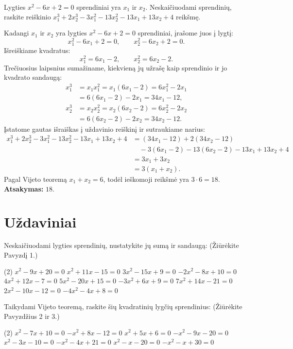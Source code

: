 \documentclass[11pt,a4paper]{scrartcl}
\begin{document}
\begin{example}
Lygties $x^2-6x+2=0$ sprendiniai yra $x_1$ ir $x_2$. Neskaičiuodami sprendinių, raskite reiškinio $x_1^3+2x_2^3-3x_1^2-13x_2^2-13x_1+13x_2+4$ reikšmę.
\end{example}
\begin{solution}
Kadangi $x_1$ ir $x_2$ yra lygties $x^2-6x+2=0$ sprendiniai, įrašome juos į lygtį:
\[
x_1^2-6x_1+2=0, \qquad x_2^2-6x_2+2=0.
\]
Išreiškiame kvadratus:
\[
x_1^2=6x_1-2, \qquad x_2^2=6x_2-2.
\]
Trečiuosius laipsnius sumažiname, kiekvieną jų užrašę kaip sprendinio ir jo kvadrato sandaugą:
\[
\begin{aligned}
x_1^3&=x_1x_1^2=x_1(6x_1-2)=6x_1^2-2x_1\\
&=6(6x_1-2)-2x_1=34x_1-12,\\
x_2^3&=x_2x_2^2=x_2(6x_2-2)=6x_2^2-2x_2\\
&=6(6x_2-2)-2x_2=34x_2-12.
\end{aligned}
\]
Įstatome gautas išraiškas į uždavinio reiškinį ir sutraukiame narius:
\[
\begin{aligned}
x_1^3+2x_2^3-3x_1^2-13x_2^2-13x_1+13x_2+4
&=(34x_1-12)+2(34x_2-12)\\
&\quad-3(6x_1-2)-13(6x_2-2)-13x_1+13x_2+4\\
&=3x_1+3x_2\\
&=3(x_1+x_2).
\end{aligned}
\]
Pagal Vijeto teoremą $x_1+x_2=6$, todėl ieškomoji reikšmė yra $3\cdot6=18$.
\textbf{Atsakymas:} $18$.
\end{solution}

\section{Uždaviniai}

\begin{problem}
Neskaičiuodami lygties sprendinių, nustatykite jų sumą ir sandaugą:
(Žiūrėkite Pavyzdį 1.)
\begin{tasks}[label={(\arabic*)}, label-offset=0.9em](2)
    \task $x^2 - 9x + 20 = 0$
    \task $x^2 + 11x - 15 = 0$
    \task $3x^2 - 15x + 9 = 0$
    \task $-2x^2 - 8x + 10 = 0$
    \task $4x^2 + 12x - 7 = 0$
    \task $5x^2 - 20x + 15 = 0$
    \task $-3x^2 + 6x + 9 = 0$
    \task $7x^2 + 14x - 21 = 0$
    \task $2x^2 - 10x - 12 = 0$
    \task $-4x^2 - 4x + 8 = 0$
\end{tasks}
\end{problem}

\begin{problem}
Taikydami Vijeto teoremą, raskite šių kvadratinių lygčių sprendinius:
(Žiūrėkite Pavyzdžius 2 ir 3.)
\begin{tasks}[label={(\arabic*)}, label-offset=0.9em](2)
    \task $x^2 - 7x + 10 = 0$
    \task $-x^2 + 8x - 12 = 0$
    \task $x^2 + 5x + 6 = 0$
    \task $-x^2 - 9x - 20 = 0$
    \task $x^2 - 3x - 10 = 0$
    \task $-x^2 - 4x + 21 = 0$
    \task $x^2 - x - 20 = 0$
    \task $-x^2 - x + 30 = 0$
\end{tasks}
\end{problem}
\end{document}
